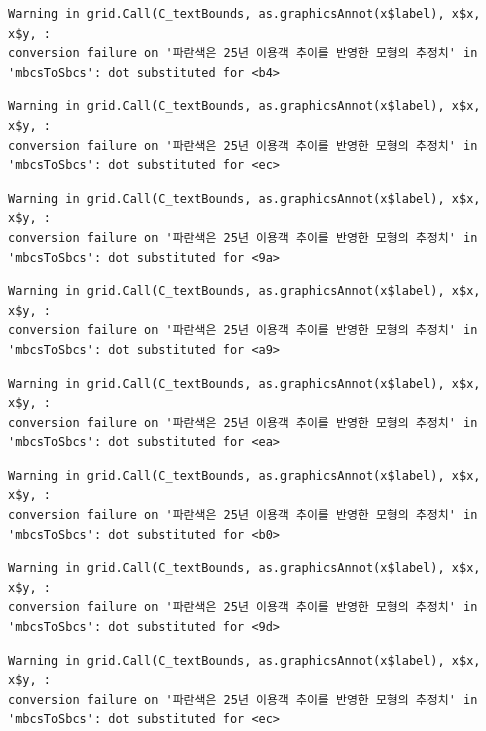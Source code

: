 \documentclass[
  letterpaper,
  DIV=11,
  numbers=noendperiod]{scrreprt}
\begin{document}
\begin{verbatim}
Warning in grid.Call(C_textBounds, as.graphicsAnnot(x$label), x$x, x$y, :
conversion failure on '파란색은 25년 이용객 추이를 반영한 모형의 추정치' in
'mbcsToSbcs': dot substituted for <b4>
\end{verbatim}

\begin{verbatim}
Warning in grid.Call(C_textBounds, as.graphicsAnnot(x$label), x$x, x$y, :
conversion failure on '파란색은 25년 이용객 추이를 반영한 모형의 추정치' in
'mbcsToSbcs': dot substituted for <ec>
\end{verbatim}

\begin{verbatim}
Warning in grid.Call(C_textBounds, as.graphicsAnnot(x$label), x$x, x$y, :
conversion failure on '파란색은 25년 이용객 추이를 반영한 모형의 추정치' in
'mbcsToSbcs': dot substituted for <9a>
\end{verbatim}

\begin{verbatim}
Warning in grid.Call(C_textBounds, as.graphicsAnnot(x$label), x$x, x$y, :
conversion failure on '파란색은 25년 이용객 추이를 반영한 모형의 추정치' in
'mbcsToSbcs': dot substituted for <a9>
\end{verbatim}

\begin{verbatim}
Warning in grid.Call(C_textBounds, as.graphicsAnnot(x$label), x$x, x$y, :
conversion failure on '파란색은 25년 이용객 추이를 반영한 모형의 추정치' in
'mbcsToSbcs': dot substituted for <ea>
\end{verbatim}

\begin{verbatim}
Warning in grid.Call(C_textBounds, as.graphicsAnnot(x$label), x$x, x$y, :
conversion failure on '파란색은 25년 이용객 추이를 반영한 모형의 추정치' in
'mbcsToSbcs': dot substituted for <b0>
\end{verbatim}

\begin{verbatim}
Warning in grid.Call(C_textBounds, as.graphicsAnnot(x$label), x$x, x$y, :
conversion failure on '파란색은 25년 이용객 추이를 반영한 모형의 추정치' in
'mbcsToSbcs': dot substituted for <9d>
\end{verbatim}

\begin{verbatim}
Warning in grid.Call(C_textBounds, as.graphicsAnnot(x$label), x$x, x$y, :
conversion failure on '파란색은 25년 이용객 추이를 반영한 모형의 추정치' in
'mbcsToSbcs': dot substituted for <ec>
\end{verbatim}
\end{document}
